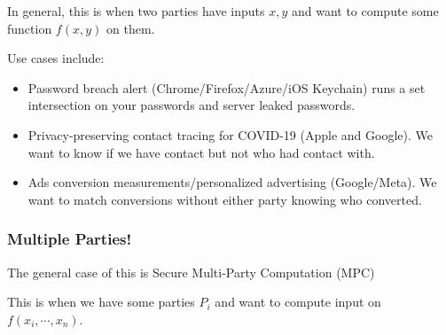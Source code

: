 In general, this is when two parties have inputs $x, y$ and want to compute some function $f(x, y)$ on them.


Use cases include:
\begin{itemize}
    \item Password breach alert (Chrome/Firefox/Azure/iOS Keychain) runs a set intersection on your passwords and server leaked passwords.
    \item Privacy-preserving contact tracing for COVID-19 (Apple and Google). We want to know if we have contact but not who had contact with.
    \item Ads conversion measurements/personalized advertising (Google/Meta). We want to match conversions without either party knowing who converted.
\end{itemize}

\subsubsection{Multiple Parties!}
The general case of this is Secure Multi-Party Computation (MPC)


This is when we have some parties $P_i$ and want to compute input on $f(x_i, \cdots, x_n)$.


